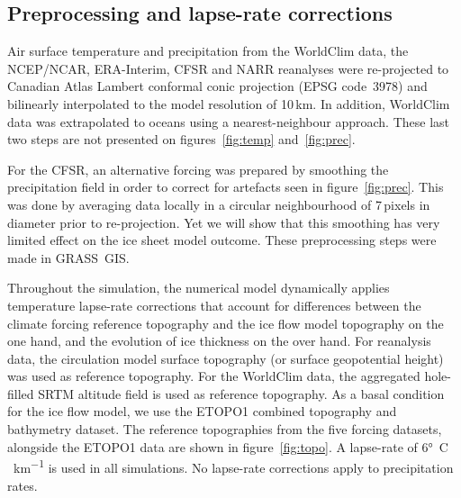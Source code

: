
\subsection{Preprocessing and lapse-rate corrections}

Air surface temperature and precipitation from the WorldClim data, the NCEP/NCAR, ERA-Interim, CFSR and NARR reanalyses were re-projected to Canadian Atlas Lambert conformal conic projection (EPSG code~3978) and bilinearly interpolated to the model resolution of 10\,km. In addition, WorldClim data was extrapolated to oceans using a nearest-neighbour approach. These last two steps are not presented on figures~\ref{fig:temp} and~\ref{fig:prec}.

For the CFSR, an alternative forcing was prepared by smoothing the precipitation field in order to correct for artefacts seen in figure~\ref{fig:prec}. This was done by averaging data locally in a circular neighbourhood of 7\,pixels in diameter prior to re-projection. Yet we will show that this smoothing has very limited effect on the ice sheet model outcome. These preprocessing steps were made in GRASS~GIS.

Throughout the simulation, the numerical model dynamically applies temperature lapse-rate corrections that account for differences between the climate forcing reference topography and the ice flow model topography on the one hand, and the evolution of ice thickness on the over hand. For reanalysis data, the circulation model surface topography (or surface geopotential height) was used as reference topography. For the WorldClim data, the aggregated hole-filled SRTM altitude field is used as reference topography. As a basal condition for the ice flow model, we use the ETOPO1\citep{data:etopo1} combined topography and bathymetry dataset. The reference topographies from the five forcing datasets, alongside the ETOPO1 data are shown in figure~\ref{fig:topo}. A lapse-rate of 6\unit{\degree C\,km^{-1}} is used in all simulations. No lapse-rate corrections apply to precipitation rates.

